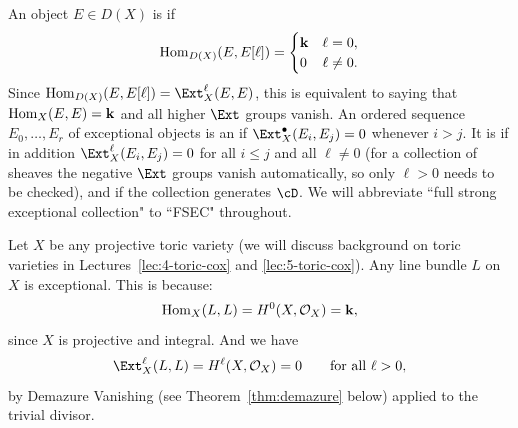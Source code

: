 \documentclass{amsart}
\begin{document}
\begin{defn}
  An object $E\in D(X)$ is  if
  \[ \operatorname{Hom}_{D(X)}(E,E[\ell]) = \begin{cases}{\bf k} & \ell=0, \\ 0 & \ell\ne 0.\end{cases} \]
  Since $\Hom_{D(X)}(E,E[\ell]) = \Ext^\ell_{X}(E,E)$, this is equivalent to saying that $\operatorname{Hom}_X(E,E)={\bf k}$ and all higher $\Ext$ groups vanish.
  An ordered sequence $E_0,\dots,E_r$ of exceptional objects is an  if $\Ext_X^\bullet(E_i,E_j)=0$ whenever $i>j$. It is  if in addition $\Ext_X^\ell(E_i,E_j)=0$ for all $i\le j$ and all $\ell\ne0$ (for a collection of sheaves the negative $\Ext$ groups vanish automatically, so only $\ell>0$ needs to be checked), and  if the collection generates $\cD$. We will abbreviate ``full strong exceptional collection" to ``FSEC" throughout.
\end{defn}
\begin{example}
    Let $X$ be any projective toric variety (we will discuss background on toric varieties in Lectures~\ref{lec:4-toric-cox} and \ref{lec:5-toric-cox}). Any line bundle $L$ on $X$ is exceptional.  This is because:
    \[
    \operatorname{Hom}_X(L,L) = H^0(X,{\mathcal O}_X) ={\bf k},
    \]
    since $X$ is projective and integral.  And we have
    \[
    \Ext^{\ell}_X(L,L) = H^{\ell}(X,\cO_X)=0 \qquad\text{for all }\ell>0,
    \]
    by Demazure Vanishing (see Theorem~\ref{thm:demazure} below) applied to the trivial divisor.
\end{example}
\end{document}
